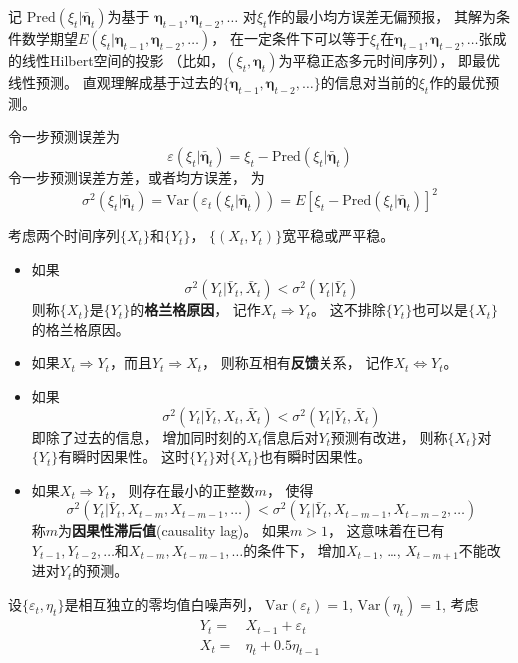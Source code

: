 \documentclass[]{book}
\providecommand{\tightlist}{%
  \setlength{\itemsep}{0pt}\setlength{\parskip}{0pt}}
\theoremstyle{definition}
\theoremstyle{definition}
\theoremstyle{definition}
\theoremstyle{remark}
\let\BeginKnitrBlock\begin \let\EndKnitrBlock\end
\begin{document}
记 \(\text{Pred}(\xi_t | \bar{\boldsymbol{\eta}}_t)\)为基于
\(\boldsymbol{\eta}_{t-1}, \boldsymbol{\eta}_{t-2}, \dots\)
对\(\xi_t\)作的最小均方误差无偏预报，
其解为条件数学期望\(E(\xi_t | \boldsymbol{\eta}_{t-1}, \boldsymbol{\eta}_{t-2}, \dots)\)，
在一定条件下可以等于\(\xi_t\)在\(\boldsymbol{\eta}_{t-1}, \boldsymbol{\eta}_{t-2}, \dots\)张成的线性Hilbert空间的投影
（比如，\((\xi_t, \boldsymbol{\eta}_t)\)为平稳正态多元时间序列），
即最优线性预测。
直观理解成基于过去的\(\{\boldsymbol{\eta}_{t-1}, \boldsymbol{\eta}_{t-2}, \dots \}\)的信息对当前的\(\xi_t\)作的最优预测。

令一步预测误差为 \[
  \varepsilon(\xi_t | \bar{\boldsymbol{\eta}}_t) 
  = \xi_t - \text{Pred}(\xi_t | \bar{\boldsymbol{\eta}}_t)
\] 令一步预测误差方差，或者均方误差， 为 \[
  \sigma^2(\xi_t | \bar{\boldsymbol{\eta}}_t)  
  = \text{Var}(\varepsilon_t(\xi_t | \bar{\boldsymbol{\eta}}_t) )
  = E \left[ \xi_t - \text{Pred}(\xi_t | \bar{\boldsymbol{\eta}}_t) \right]^2
\]

考虑两个时间序列\(\{ X_t \}\)和\(\{ Y_t \}\)，
\(\{(X_t, Y_t) \}\)宽平稳或严平稳。

\begin{itemize}
\tightlist
\item
  如果 \[
  \sigma^2(Y_t | \bar Y_t, \bar X_t) < \sigma^2(Y_t | \bar Y_t)
  \] 则称\(\{ X_t \}\)是\(\{ Y_t \}\)的\textbf{格兰格原因}，
  记作\(X_t \Rightarrow Y_t\)。
  这不排除\(\{ Y_t \}\)也可以是\(\{ X_t \}\)的格兰格原因。
\item
  如果\(X_t \Rightarrow Y_t\)，而且\(Y_t \Rightarrow X_t\)，
  则称互相有\textbf{反馈}关系， 记作\(X_t \Leftrightarrow Y_t\)。
\item
  如果 \[
  \sigma^2(Y_t | \bar Y_t, X_t, \bar X_t) < \sigma^2(Y_t | \bar Y_t, \bar X_t)
  \] 即除了过去的信息， 增加同时刻的\(X_t\)信息后对\(Y_t\)预测有改进，
  则称\(\{X_t \}\)对\(\{Y_t \}\)有瞬时因果性。
  这时\(\{Y_t \}\)对\(\{X_t \}\)也有瞬时因果性。
\item
  如果\(X_t \Rightarrow Y_t\)， 则存在最小的正整数\(m\)， 使得 \[
  \sigma^2(Y_t | \bar Y_t, X_{t-m}, X_{t-m-1}, \dots) 
  < \sigma^2(Y_t | \bar Y_t, X_{t-m-1}, X_{t-m-2}, \dots) 
  \] 称\(m\)为\textbf{因果性滞后值}(causality lag)。 如果\(m>1\)，
  这意味着在已有\(Y_{t-1}, Y_{t-2}, \dots\)和\(X_{t-m}, X_{t-m-1}, \dots\)的条件下，
  增加\(X_{t-1}\), \dots, \(X_{t-m+1}\)不能改进对\(Y_t\)的预测。
\end{itemize}

\BeginKnitrBlock{example}
\protect\hypertarget{exm:causal-exaxylag1}{}{\label{exm:causal-exaxylag1}
}设\(\{ \varepsilon_t, \eta_t \}\)是相互独立的零均值白噪声列，
\(\text{Var}(\varepsilon_t)=1\), \(\text{Var}(\eta_t)=1\), 考虑
\[\begin{aligned}
Y_t =& X_{t-1} + \varepsilon_t \\
X_t =& \eta_t + 0.5 \eta_{t-1}
\end{aligned}\]
\EndKnitrBlock{example}
\end{document}
